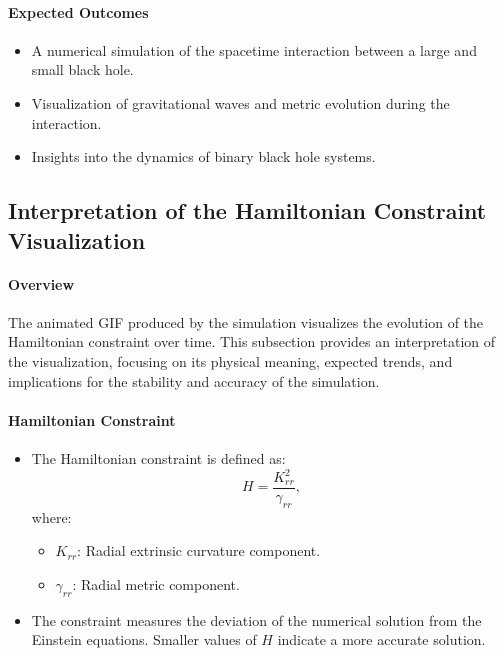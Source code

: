 \documentclass[12pt]{article}
\begin{document}
\paragraph{Expected Outcomes}
\begin{itemize}
    \item A numerical simulation of the spacetime interaction between a large and small black hole.
    \item Visualization of gravitational waves and metric evolution during the interaction.
    \item Insights into the dynamics of binary black hole systems.
\end{itemize}

\subsection{Interpretation of the Hamiltonian Constraint Visualization}

\paragraph{Overview}
The animated GIF produced by the simulation visualizes the evolution of the Hamiltonian constraint over time. This subsection provides an interpretation of the visualization, focusing on its physical meaning, expected trends, and implications for the stability and accuracy of the simulation.

\paragraph{Hamiltonian Constraint}
\begin{itemize}
    \item The Hamiltonian constraint is defined as:
    \[
    H = \frac{K_{rr}^2}{\gamma_{rr}},
    \]
    where:
    \begin{itemize}
        \item \( K_{rr} \): Radial extrinsic curvature component.
        \item \( \gamma_{rr} \): Radial metric component.
    \end{itemize}
    \item The constraint measures the deviation of the numerical solution from the Einstein equations. Smaller values of \( H \) indicate a more accurate solution.
\end{itemize}
\end{document}
